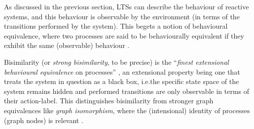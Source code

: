 %
\begin{isabellebody}%
%
%
\isadelimtheory
%
\endisadelimtheory
%
\isatagtheory
%
\endisatagtheory
{\isafoldtheory}%
%
\isadelimtheory
%
\endisadelimtheory
%
\isadelimdocument
%
\endisadelimdocument
%
\isatagdocument
%
\isamarkuptrue%
%
\endisatagdocument
{\isafolddocument}%
%
\isadelimdocument
%
\endisadelimdocument
%
\begin{isamarkuptext}%
\label{sec:strong_bisimilarity}%
\end{isamarkuptext}\isamarkuptrue%
%
\begin{isamarkuptext}%
As discussed in the previous section, LTSs can describe the behaviour of reactive systems, and this behaviour is observable by the environment (in terms of the transitions performed by the system). This begets a notion of behavioural equivalence, where two processes are said to be behaviourally equivalent if they exhibit the same (observable) behaviour \cite{reactivesystems}.

Bisimilarity (or \emph{strong bisimilarity}, to be precise) is the \enquote{\emph{finest extensional behavioural equivalence} \textelp{} on processes} \cite[section 0.1]{introBC}, an extensional property being one that treats the system in question as a black box, i.e.\@ the specific state space of the system remains hidden and performed transitions are only observable in terms of their action-label. This distinguishes bisimilarity from stronger graph equivalences like \emph{graph isomorphism}, where the (intensional) identity of processes (graph nodes) is relevant \cite{advBC_origins}.

\end{isamarkuptext}
\end{isabellebody}
